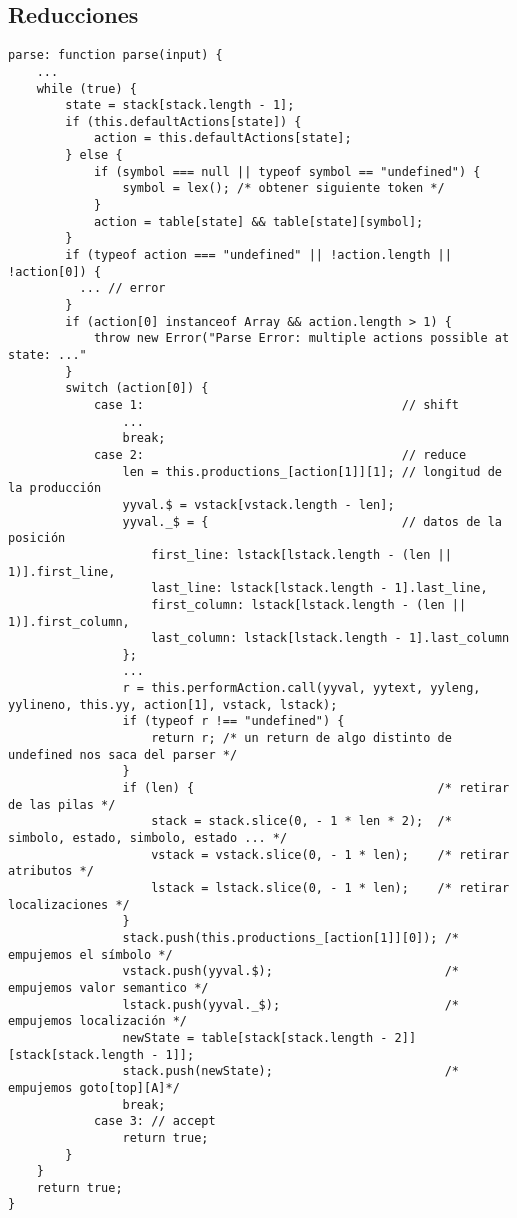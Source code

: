\subsection{Reducciones}
\begin{verbatim}
parse: function parse(input) {
    ...
    while (true) {
        state = stack[stack.length - 1];
        if (this.defaultActions[state]) {
            action = this.defaultActions[state];
        } else {
            if (symbol === null || typeof symbol == "undefined") {
                symbol = lex(); /* obtener siguiente token */
            }
            action = table[state] && table[state][symbol];
        }
        if (typeof action === "undefined" || !action.length || !action[0]) {
          ... // error
        }
        if (action[0] instanceof Array && action.length > 1) {
            throw new Error("Parse Error: multiple actions possible at state: ..." 
        }
        switch (action[0]) {
            case 1:                                    // shift
                ...
                break;
            case 2:                                    // reduce
                len = this.productions_[action[1]][1]; // longitud de la producción
                yyval.$ = vstack[vstack.length - len];
                yyval._$ = {                           // datos de la posición
                    first_line: lstack[lstack.length - (len || 1)].first_line,
                    last_line: lstack[lstack.length - 1].last_line,
                    first_column: lstack[lstack.length - (len || 1)].first_column,
                    last_column: lstack[lstack.length - 1].last_column
                };
                ...
                r = this.performAction.call(yyval, yytext, yyleng, yylineno, this.yy, action[1], vstack, lstack);
                if (typeof r !== "undefined") {
                    return r; /* un return de algo distinto de undefined nos saca del parser */
                }
                if (len) {                                  /* retirar de las pilas */
                    stack = stack.slice(0, - 1 * len * 2);  /* simbolo, estado, simbolo, estado ... */
                    vstack = vstack.slice(0, - 1 * len);    /* retirar atributos */
                    lstack = lstack.slice(0, - 1 * len);    /* retirar localizaciones */
                }
                stack.push(this.productions_[action[1]][0]); /* empujemos el símbolo */
                vstack.push(yyval.$);                        /* empujemos valor semantico */
                lstack.push(yyval._$);                       /* empujemos localización */
                newState = table[stack[stack.length - 2]][stack[stack.length - 1]];
                stack.push(newState);                        /* empujemos goto[top][A]*/
                break;
            case 3: // accept
                return true;
        }
    }
    return true;
}
\end{verbatim}

